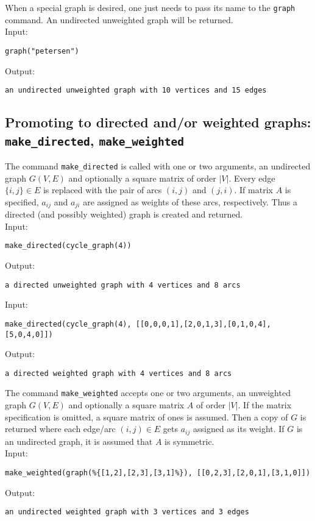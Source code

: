 \documentclass[a4paper,11pt]{article}
\begin{document}
When a special graph is desired, one just needs to pass its name to the {\tt graph} command. An undirected unweighted graph will be returned.\\
Input:
\begin{center}
  \tt graph("petersen")
\end{center}
Output:
\begin{center}
  \tt an undirected unweighted graph with 10 vertices and 15 edges
\end{center}

\subsection{Promoting to directed and/or weighted graphs: {\tt make\_directed}, {\tt make\_weighted}}

The command {\tt make\_directed} is called with one or two arguments, an undirected graph $ G(V,E) $ and optionally a square matrix of order $ |V| $. Every edge $ \{i,j\}\in E $ is replaced with the pair of arcs $ (i,j) $ and $ (j,i) $. If matrix $ A $ is specified, $ a_{ij} $ and $ a_{ji} $ are assigned as weights of these arcs, respectively. Thus a directed (and possibly weighted) graph is created and returned.\\
Input:
\begin{center}
  \tt make\_directed(cycle\_graph(4))
\end{center}
Output:
\begin{center}
  \tt a directed unweighted graph with 4 vertices and 8 arcs
\end{center}
Input:
\begin{center}
   \tt make\_directed(cycle\_graph(4), [[0,0,0,1],[2,0,1,3],[0,1,0,4],[5,0,4,0]])
\end{center}
Output:
\begin{center}
  \tt a directed weighted graph with 4 vertices and 8 arcs
\end{center}

The command {\tt make\_weighted} accepts one or two arguments, an unweighted graph $ G(V,E) $ and optionally a square matrix $ A $ of order $ |V| $. If the matrix specification is omitted, a square matrix of ones is assumed. Then a copy of $ G $ is returned where each edge/arc $ (i,j)\in E $ gets $ a_{ij} $ assigned as its weight. If $ G $ is an undirected graph, it is assumed that $ A $ is symmetric.\\
Input:
\begin{center}
  \tt make\_weighted(graph(\%\{[1,2],[2,3],[3,1]\%\}), [[0,2,3],[2,0,1],[3,1,0]])
\end{center}
Output:
\begin{center}
  \tt an undirected weighted graph with 3 vertices and 3 edges
\end{center}
\end{document}
